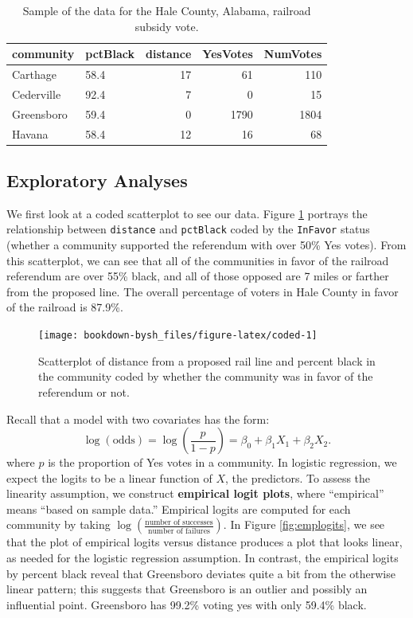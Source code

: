 \documentclass[
]{krantz}
\begin{document}
\begin{table}[t]

\caption{\label{tab:table2chp6}Sample of the data for the Hale County, Alabama, railroad subsidy vote.}
\centering
\begin{tabular}{llrrr}
\toprule
community & pctBlack & distance & YesVotes & NumVotes\\
\midrule
Carthage & 58.4 & 17 & 61 & 110\\
Cederville & 92.4 & 7 & 0 & 15\\
Greensboro & 59.4 & 0 & 1790 & 1804\\
Havana & 58.4 & 12 & 16 & 68\\
\bottomrule
\end{tabular}
\end{table}

\hypertarget{exploratory-analyses}{%
\subsection{Exploratory Analyses}\label{exploratory-analyses}}

We first look at a coded scatterplot to see our data. Figure \ref{fig:coded} portrays the relationship between \texttt{distance} and \texttt{pctBlack} coded by the \texttt{InFavor} status (whether a community supported the referendum with over 50\% Yes votes). From this scatterplot, we can see that all of the communities in favor of the railroad referendum are over 55\% black, and all of those opposed are 7 miles or farther from the proposed line. The overall percentage of voters in Hale County in favor of the railroad is 87.9\%.

\begin{figure}

{\centering \texttt{[image: bookdown-bysh\_files/figure-latex/coded-1]} 

}

\caption{ Scatterplot of distance from a proposed rail line and percent black in the community coded by whether the community was in favor of the referendum or not.}\label{fig:coded}
\end{figure}

Recall that a model with two covariates has the form:
\[\log(\textrm{odds}) = \log\left(\frac{p}{1-p}\right) = \beta_0+\beta_1X_1+\beta_2X_2.\]
where \(p\) is the proportion of Yes votes in a community. In logistic regression, we expect the logits to be a linear function of \(X\), the predictors. To assess the linearity assumption, we construct \textbf{empirical logit plots}, where ``empirical'' means ``based on sample data.'' Empirical logits are computed for each community by taking \(\log\left(\frac{\textrm{number of successes}}{\textrm{number of failures}}\right)\). In Figure \ref{fig:emplogits}, we see that the plot of empirical logits versus distance produces a plot that looks linear, as needed for the logistic regression assumption. In contrast, the empirical logits by percent black reveal that Greensboro deviates quite a bit from the otherwise linear pattern; this suggests that Greensboro is an outlier and possibly an influential point. Greensboro has 99.2\% voting yes with only 59.4\% black.
\end{document}
